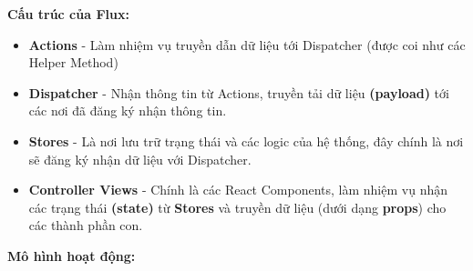 \textbf{Cấu trúc của Flux:}
\begin{itemize}
    \item \textbf{Actions} - Làm nhiệm vụ truyền dẫn dữ liệu tới Dispatcher (được coi như các Helper Method)
    \item \textbf{Dispatcher} - Nhận thông tin từ Actions, truyền tải dữ liệu \textbf{(payload)} tới các nơi đã đăng ký nhận thông tin.
    \item \textbf{Stores} - Là nơi lưu trữ trạng thái và các logic của hệ thống, đây chính là nơi sẽ đăng ký nhận dữ liệu với Dispatcher.
    \item \textbf{Controller Views} - Chính là các React Components, làm nhiệm vụ nhận các trạng thái \textbf{(state)} từ \textbf{Stores} và truyền dữ liệu (dưới dạng \textbf{props}) cho các thành phần con.
\end{itemize}
\textbf{Mô hình hoạt động:}


